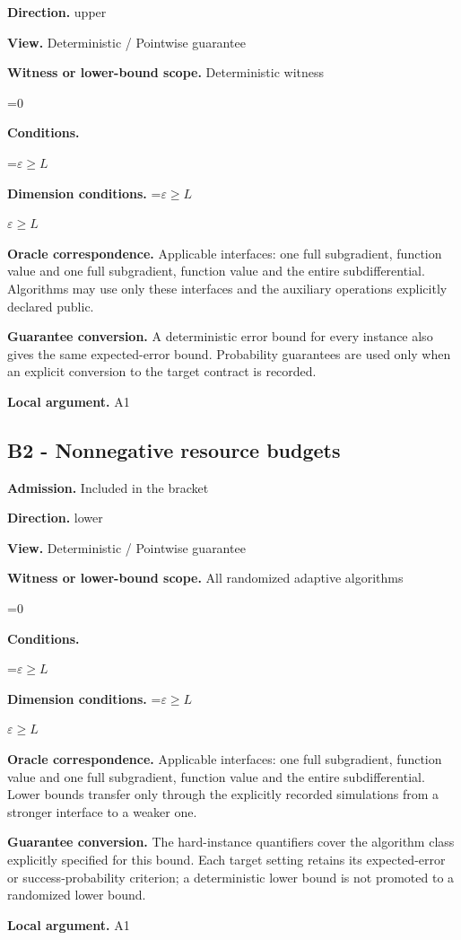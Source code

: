 \documentclass[10pt,a4paper]{article}
\newcommand{\AtlasMath}[1]{\par\begingroup\centering\setbox0=\hbox{$\displaystyle #1$}\ifdim\wd0>1.4\linewidth\typeout{ATLAS WIDE FORMULA: \the\wd0}\fi\ifdim\wd0>\linewidth\resizebox{\linewidth}{!}{\box0}\else\box0\fi\par\endgroup}
\newcommand{\AtlasInlineMath}[1]{\begingroup\setbox0=\hbox{$#1$}\ifdim\wd0>.4\linewidth\endgroup\AtlasMath{#1}\else\endgroup$#1$\fi}
\begin{document}
\textbf{Direction.} upper

\textbf{View.} Deterministic / Pointwise guarantee

\textbf{Witness or lower-bound scope.} Deterministic witness

\AtlasMath{0}
\textbf{Conditions.} 
\AtlasMath{\varepsilon\ge L}


\textbf{Dimension conditions.} \AtlasInlineMath{\varepsilon\ge L}

\textbf{Oracle correspondence.} Applicable interfaces: one full subgradient, function value and one full subgradient, function value and the entire subdifferential. Algorithms may use only these interfaces and the auxiliary operations explicitly declared public.

\textbf{Guarantee conversion.} A deterministic error bound for every instance also gives the same expected-error bound. Probability guarantees are used only when an explicit conversion to the target contract is recorded.

\textbf{Local argument.} A1

\subsection{B2 - Nonnegative resource budgets}
\textbf{Admission.} Included in the bracket

\textbf{Direction.} lower

\textbf{View.} Deterministic / Pointwise guarantee

\textbf{Witness or lower-bound scope.} All randomized adaptive algorithms

\AtlasMath{0}
\textbf{Conditions.} 
\AtlasMath{\varepsilon\ge L}


\textbf{Dimension conditions.} \AtlasInlineMath{\varepsilon\ge L}

\textbf{Oracle correspondence.} Applicable interfaces: one full subgradient, function value and one full subgradient, function value and the entire subdifferential. Lower bounds transfer only through the explicitly recorded simulations from a stronger interface to a weaker one.

\textbf{Guarantee conversion.} The hard-instance quantifiers cover the algorithm class explicitly specified for this bound. Each target setting retains its expected-error or success-probability criterion; a deterministic lower bound is not promoted to a randomized lower bound.

\textbf{Local argument.} A1
\end{document}
